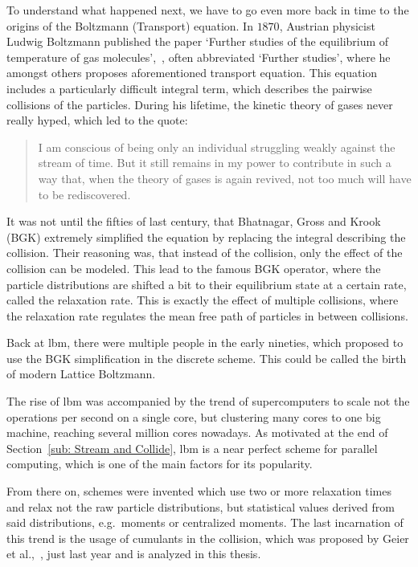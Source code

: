 To understand what happened next, we have to go even more back in time to the origins of the Boltzmann (Transport) equation.
In $1870$, Austrian physicist Ludwig Boltzmann published the paper `Further studies of the equilibrium of temperature of gas molecules',~\cite{Boltzmann1970}, often abbreviated `Further studies', where he amongst others proposes aforementioned transport equation.
This equation includes a particularly difficult integral term, which describes the pairwise collisions of the particles.
During his lifetime, the kinetic theory of gases never really hyped, which led to the quote:
\begin{quotation}
I am conscious of being only an individual struggling weakly against the stream of time.
But it still remains in my power to contribute in such a way that, when the theory of gases is again revived, not too much will have to be rediscovered.
\end{quotation}
It was not until the fifties of last century, that Bhatnagar, Gross and Krook (BGK) extremely simplified the equation by replacing the integral describing the collision.
Their reasoning was, that instead of the collision, only the effect of the collision can be modeled.
This lead to the famous BGK operator, where the particle distributions are shifted a bit to their equilibrium state at a certain rate, called the relaxation rate.
This is exactly the effect of multiple collisions, where the relaxation rate regulates the mean free path of particles in between collisions.

Back at \gls{lbm}, there were multiple people in the early nineties, which proposed to use the BGK simplification in the discrete scheme.
This could be called the birth of modern Lattice Boltzmann.

The rise of \gls{lbm} was accompanied by the trend of supercomputers to scale not the operations per second on a single core, but clustering many cores to one big machine, reaching several million cores nowadays.
As motivated at the end of Section~\ref{sub: Stream and Collide}, \gls{lbm} is a near perfect scheme for parallel computing, which is one of the main factors for its popularity.

From there on, schemes were invented which use two or more relaxation times and relax not the raw particle distributions, but statistical values derived from said distributions, e.g.\ moments or centralized moments.
The last incarnation of this trend is the usage of cumulants in the collision, which was proposed by Geier et al.,~\cite{geier2015cumulant}, just last year and is analyzed in this thesis.
